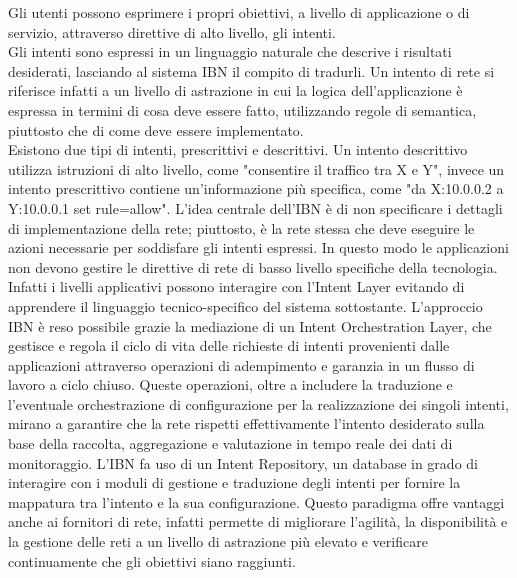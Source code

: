 Gli utenti possono esprimere i propri obiettivi, a livello di applicazione o di servizio, attraverso direttive di alto livello, gli intenti.
\\Gli intenti sono espressi in un linguaggio naturale che descrive i risultati desiderati, lasciando al sistema IBN il compito di tradurli.
Un intento di rete si riferisce infatti a un livello di astrazione in cui la logica dell'applicazione è espressa in termini di cosa deve essere fatto, utilizzando regole di semantica, piuttosto che di come deve essere implementato.
\\Esistono due tipi di intenti, prescrittivi e descrittivi.
Un intento descrittivo utilizza istruzioni di alto livello, come "consentire il traffico tra X e Y", invece un intento prescrittivo contiene un'informazione 
più specifica, come "da X:10.0.0.2 a Y:10.0.0.1 set rule=allow"\cite{ibn2}.
L'idea centrale dell'IBN è di non specificare i dettagli di implementazione della rete; piuttosto, è la rete stessa che deve eseguire le azioni necessarie per soddisfare gli intenti espressi.
In questo modo le applicazioni non devono gestire le direttive di rete di basso livello specifiche della tecnologia. Infatti i livelli applicativi possono interagire con l'Intent Layer evitando di apprendere il linguaggio tecnico-specifico del sistema sottostante.
L'approccio IBN è reso possibile grazie la mediazione di un Intent Orchestration Layer, che gestisce e regola il ciclo di vita delle richieste di intenti provenienti dalle applicazioni attraverso operazioni 
di adempimento e garanzia in un flusso di lavoro a ciclo chiuso.
Queste operazioni, oltre a includere la traduzione e l'eventuale orchestrazione di configurazione per la realizzazione dei singoli intenti, mirano a garantire che la rete rispetti effettivamente l'intento desiderato 
sulla base della raccolta, aggregazione e valutazione in tempo reale dei dati di monitoraggio.
L'IBN fa uso di un Intent Repository, un database in grado di interagire con i moduli di gestione e traduzione 
degli intenti per fornire la mappatura tra l'intento e la sua configurazione.
Questo paradigma offre vantaggi anche ai fornitori di rete, infatti permette di migliorare l'agilità, la disponibilità
e la gestione delle reti a un livello di astrazione più elevato e verificare continuamente che gli obiettivi siano raggiunti. 


